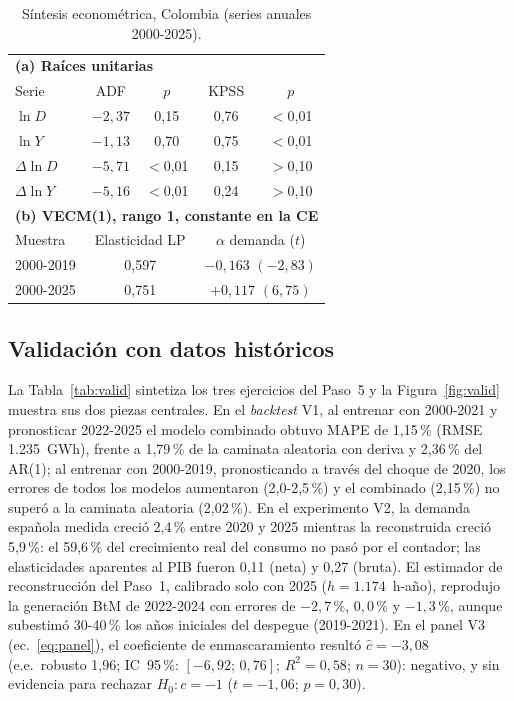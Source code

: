 \documentclass[11pt,letterpaper]{article}
\begin{document}
\begin{table}[htb]\centering\small
\caption{Síntesis econométrica, Colombia (series anuales 2000-2025).}
\label{tab:econ}
\begin{tabular}{lcccc}
\toprule
\multicolumn{5}{l}{\textbf{(a) Raíces unitarias}}\\
Serie & ADF & $p$ & KPSS & $p$\\
\midrule
$\ln D$ & $-2{,}37$ & 0,15 & 0,76 & $<$0,01\\
$\ln Y$ & $-1{,}13$ & 0,70 & 0,75 & $<$0,01\\
$\Delta\ln D$ & $-5{,}71$ & $<$0,01 & 0,15 & $>$0,10\\
$\Delta\ln Y$ & $-5{,}16$ & $<$0,01 & 0,24 & $>$0,10\\
\midrule
\multicolumn{5}{l}{\textbf{(b) VECM(1), rango 1, constante en la CE}}\\
Muestra & \multicolumn{2}{c}{Elasticidad LP} & \multicolumn{2}{c}{$\alpha$ demanda ($t$)}\\
\midrule
2000-2019 & \multicolumn{2}{c}{0,597} & \multicolumn{2}{c}{$-0{,}163$ $(-2{,}83)$}\\
2000-2025 & \multicolumn{2}{c}{0,751} & \multicolumn{2}{c}{$+0{,}117$ $(6{,}75)$}\\
\bottomrule
\end{tabular}
\end{table}

\subsection{Validación con datos históricos}

La Tabla~\ref{tab:valid} sintetiza los tres ejercicios del Paso~5 y la
Figura~\ref{fig:valid} muestra sus dos piezas centrales. En el
\emph{backtest} V1, al entrenar con 2000-2021 y pronosticar 2022-2025 el
modelo combinado obtuvo MAPE de 1,15\,\% (RMSE 1.235~GWh), frente a
1,79\,\% de la caminata aleatoria con deriva y 2,36\,\% del AR(1); al
entrenar con 2000-2019, pronosticando a través del choque de 2020, los
errores de todos los modelos aumentaron (2,0-2,5\,\%) y el combinado
(2,15\,\%) no superó a la caminata aleatoria (2,02\,\%). En el experimento
V2, la demanda española medida creció 2,4\,\% entre 2020 y 2025 mientras la
reconstruida creció 5,9\,\%: el 59,6\,\% del crecimiento real del consumo no
pasó por el contador; las elasticidades aparentes al PIB fueron 0,11 (neta)
y 0,27 (bruta). El estimador de reconstrucción del Paso~1, calibrado solo
con 2025 ($h=1.174$~h-año), reprodujo la generación BtM de 2022-2024 con
errores de $-2{,}7$\,\%, $0{,}0$\,\% y $-1{,}3$\,\%, aunque subestimó
30-40\,\% los años iniciales del despegue (2019-2021). En el panel V3
(ec.~\ref{eq:panel}), el coeficiente de enmascaramiento resultó
$\hat{c}=-3{,}08$ (e.e.\ robusto 1,96; IC~95\,\%: $[-6{,}92;\,0{,}76]$;
$R^2=0{,}58$; $n=30$): negativo, y sin evidencia para rechazar
$H_0\!:c=-1$ ($t=-1{,}06$; $p=0{,}30$).
\end{document}
